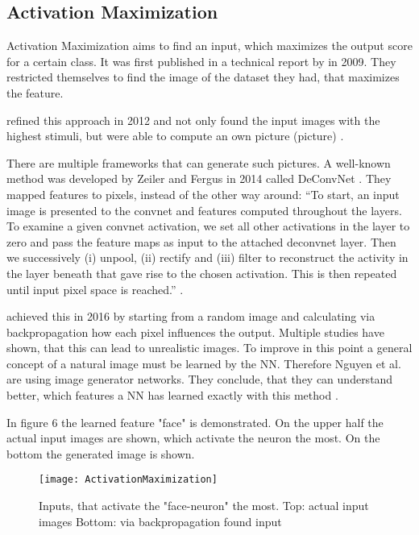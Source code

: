 \subsection{Activation Maximization}
Activation Maximization aims to find an input, which maximizes the output score for a certain class. It was first published in a technical report by  in 2009. They restricted themselves to find the image of the dataset they had, that maximizes the feature.
\par
{} refined this approach in 2012 and not only found the input images with the highest stimuli, but were able to compute an own picture (picture) \cite{Le.2012}.
\par
There are multiple frameworks that can generate such pictures. A well-known method was developed by Zeiler and Fergus in 2014 called DeConvNet \cite{Zeiler.2014}. They mapped features to pixels, instead of the other way around:
“To start, an input image is presented to the convnet and features computed throughout the layers. To examine a given convnet activation, we set all other activations in the layer to zero and pass the feature maps as input to the attached deconvnet layer. Then we successively (i) unpool, (ii) rectify and (iii) filter to reconstruct the activity in the layer beneath that gave rise to the chosen activation. This is then repeated until input pixel space is reached.” \cite[820]{Zeiler.2014}.
\par
{} achieved this in 2016 by starting from a random image and calculating via backpropagation how each pixel influences the output. Multiple studies have shown, that this can lead to unrealistic images. To improve in this point a general concept of a natural image must be learned by the NN. Therefore Nguyen et al. are using image generator networks. They conclude, that they can understand better, which features a NN has learned exactly with this method \cite{Nguyen.2016}. 
\par
In figure 6 the learned feature "face" is demonstrated. On the upper half the actual input images are shown, which activate the neuron the most. On the bottom the generated image is shown.
\begin{figure*}[h]
    \center
    \texttt{[image: ActivationMaximization]}
    \caption{Inputs, that activate the "face-neuron" the most.
    Top: actual input images 
    Bottom: via backpropagation found input}
\end{figure*}